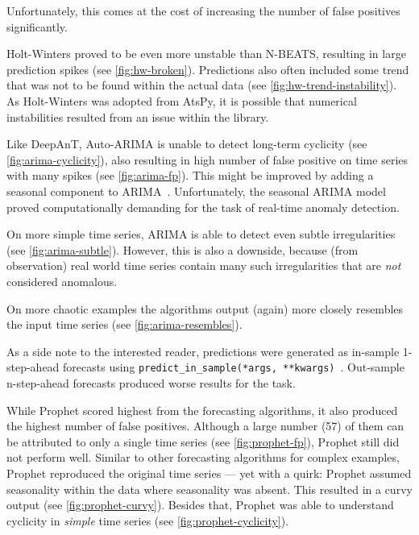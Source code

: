 \begin{description}[style=unboxed,leftmargin=0cm]
    Unfortunately, this comes at the cost of increasing the number of false positives
    significantly.
    \item[Holt-Winters] Holt-Winters proved to be even more unstable than N-BEATS,
    resulting in large prediction spikes (see \cref{fig:hw-broken}). Predictions also
    often included some trend that was not to be found within the actual data (see
    \cref{fig:hw-trend-instability}). As Holt-Winters was adopted from AtsPy,
    it is possible that numerical instabilities resulted from an issue within the library.
    \item[Auto-ARIMA] Like DeepAnT, Auto-ARIMA is unable to detect long-term
    cyclicity (see \cref{fig:arima-cyclicity}), also resulting in high number of
    false positive on time series with many spikes (see \cref{fig:arima-fp}).
    This might be improved by adding a seasonal component to ARIMA~\cite[cf.][]{Box.2016}.
    Unfortunately, the seasonal ARIMA model proved computationally demanding for
    the task of real-time anomaly detection.

    On more simple time series, ARIMA is able to detect even subtle irregularities
    (see \cref{fig:arima-subtle}). However, this is also a downside, because
    (from observation) real world time series contain many such irregularities
    that are \textit{not} considered anomalous.
    
    On more chaotic examples the algorithms output (again) more closely resembles
    the input time series (see \cref{fig:arima-resembles}).
    
    As a side note to the interested reader, predictions were generated as in-sample
    1-step-ahead forecasts using \mbox{\texttt{predict\_in\_sample(*args, **kwargs)}~\cite{Smith.2017}}.
    Out-sample n-step-ahead forecasts produced worse results for the task.
    \item[Prophet] While Prophet scored highest from the forecasting algorithms,
    it also produced the highest number of false positives. Although a large number
    (57) of them can be attributed to only a single time series (see \cref{fig:prophet-fp}),
    Prophet still did not perform well. Similar to other forecasting algorithms
    for complex examples, Prophet reproduced the original time series --- yet
    with a quirk: Prophet assumed seasonality within the data where seasonality
    was absent. This resulted in a curvy output (see \cref{fig:prophet-curvy}).
    Besides that, Prophet was able to understand cyclicity in \textit{simple} time
    series (see \cref{fig:prophet-cyclicity}).
\end{description}
